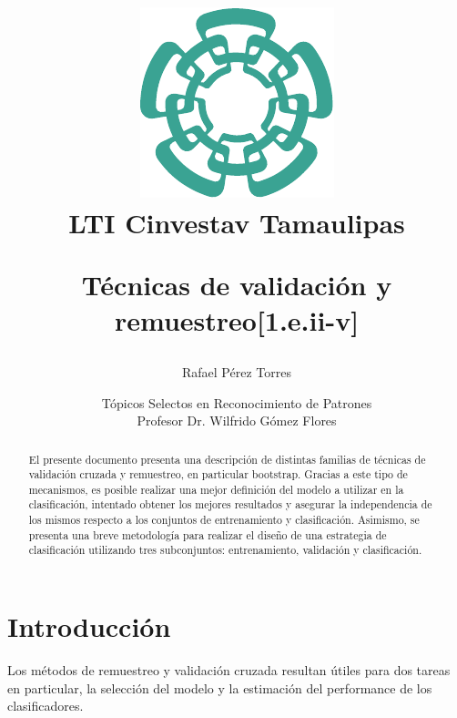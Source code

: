 \documentclass{article}
\begin{document}
\title{
	\begin{figure}[!ht]
	\centering
		\includegraphics[scale=0.8]{resources/images/cinvestav-logo}
		\\[0.5cm]LTI Cinvestav Tamaulipas
	\end{figure}
	\vspace{1cm}
	Técnicas de validación y remuestreo{\small[1.e.ii-v]}
	\vspace{1cm}
}
	
\author{Rafael Pérez Torres}	
		
\date{
	Tópicos Selectos en Reconocimiento de Patrones \\ 
	\vspace{0.8cm}
	Profesor Dr. Wilfrido Gómez Flores \\
	\vspace{1cm}
}

\maketitle

\begin{abstract}
El presente documento presenta una descripción de distintas familias de técnicas de validación cruzada y remuestreo, en particular bootstrap.
Gracias a este tipo de mecanismos, es posible realizar una mejor definición del modelo a utilizar en la clasificación, intentado obtener los mejores resultados y asegurar la independencia de los mismos respecto a los conjuntos de entrenamiento y clasificación.
Asimismo, se presenta una breve metodología para realizar el diseño de una estrategia de clasificación utilizando tres subconjuntos: entrenamiento, validación y clasificación.
\end{abstract}

\section{Introducción}
Los métodos de remuestreo y validación cruzada resultan útiles para dos tareas en particular, la selección del modelo y la estimación del performance de los clasificadores.
\end{document}
